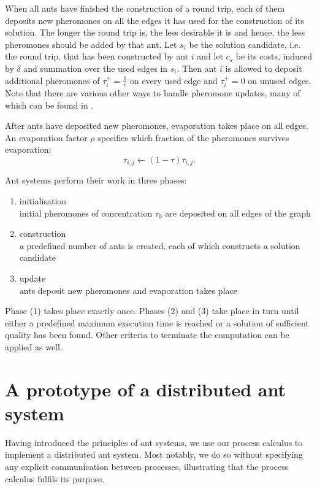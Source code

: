 When all ants have finished the construction of a round trip, each of them deposits new pheromones on all the edges it has used for the construction of its solution. The longer the round trip is, the less desirable it is and hence, the less pheromones should be added by that ant. Let $s_i$ be the solution candidate, i.e. the round trip, that has been constructed by ant $i$ and let $c_s$ be its costs, induced by $\delta$ and summation over the used edges in $s_i$. Then ant $i$ is allowed to deposit additional pheromones of $\tau_i^+ = \frac{1}{c}$ on every used edge and $\tau_i^+ = 0$ on unused edges. Note that there are various other ways to handle pheromone updates, many of which can be found in \cite{Dorigo:2004:ACO:975277}.

After ants have deposited new pheromones, evaporation takes place on all edges. An evaporation factor $\rho$ specifies which fraction of the pheromones survives evaporation:
\begin{equation}
  \label{eqn:evaporation}
  \tau_{i,j} \leftarrow \left( 1 - \tau \right) \tau_{i,j}.
\end{equation}

Ant systems perform their work in three phases:
\begin{enumerate}
  \item initialisation \\
    initial pheromones of concentration $\tau_0$ are deposited on all edges of the graph
  \vspace*{-0.5em}
  \item construction \\
    a predefined number of ants is created, each of which constructs a solution candidate \hspace*{-1em}
  \vspace*{-0.5em}
  \item update \\
    ants deposit new pheromones and evaporation takes place
\end{enumerate}
Phase (1) takes place exactly once. Phases (2) and (3) take place in turn until either a predefined maximum execution time is reached or a solution of sufficient quality has been found. Other criteria to terminate the computation can be applied as well.

\section{A prototype of a distributed ant system}
\label{chp:ant_system_implementation}
Having introduced the principles of ant systems, we use our process calculus to implement a distributed ant system. Most notably, we do so without specifying any explicit communication between processes, illustrating that the process calculus fulfils its purpose.

